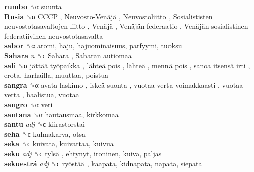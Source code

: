 \textbf{rumbo} ␝α  suunta  \\
\textbf{Rusia} ␝α   CCCP ,  Neuvosto-Venäjä ,  Neuvostoliitto ,  Sosialististen neuvostotasavaltojen liitto ,  Venäjä ,  Venäjän federaatio ,  Venäjän sosialistinen federatiivinen neuvostotasavalta   \\
\textbf{sabor} ␝α  aromi, haju, hajuominaisuus, parfyymi, tuoksu  \\
\textbf{Sahara} \emph{n}  ␝ϲ   Sahara ,  Saharan autiomaa   \\
\textbf{sali} ␝α   jättää työpaikka ,  lähteä pois ,  lähteä ,  mennä pois ,  sanoa itsensä irti , erota, harhailla, muuttaa, poistua  \\
\textbf{sangra} ␝α   avata laskimo ,  iskeä suonta ,  vuotaa verta voimakkaasti ,  vuotaa verta , haalistua, vuotaa  \\
\textbf{sangro} ␝α  veri  \\
\textbf{santana} ␝α  hautausmaa, kirkkomaa  \\
\textbf{santu} \emph{adj}  ␝ϲ  kiirastorstai  \\
\textbf{seha} ␝ϲ  kulmakarva, otsa  \\
\textbf{seka} ␝ϲ  kuivata, kuivattaa, kuivua  \\
\textbf{seku} \emph{adj}  ␝ϲ   tylsä , ehtynyt, ironinen, kuiva, paljas  \\
\textbf{sekuestrá} \emph{adj}  ␝ϲ   ryöstää , kaapata, kidnapata, napata, siepata  \\
